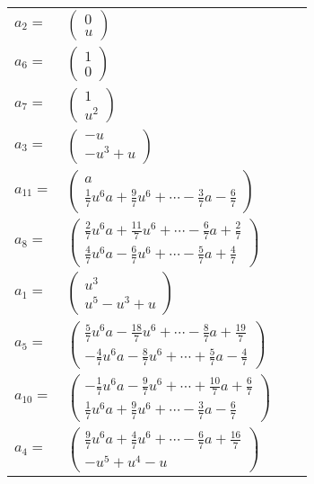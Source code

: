 \documentclass[1p]{elsarticle_modified}
\theoremstyle{definition}
\begin{document}
\begin{tabular}{m{7pt} m{180pt} m{7pt} m{180pt} }
\flushright $a_{2}=$&$\begin{pmatrix}0\\u\end{pmatrix}$ \\
\flushright $a_{6}=$&$\begin{pmatrix}1\\0\end{pmatrix}$ \\
\flushright $a_{7}=$&$\begin{pmatrix}1\\u^2\end{pmatrix}$ \\
\flushright $a_{3}=$&$\begin{pmatrix}- u\\- u^3+u\end{pmatrix}$ \\
\flushright $a_{11}=$&$\begin{pmatrix}a\\\frac{1}{7} u^6 a+\frac{9}{7} u^6+\cdots-\frac{3}{7} a-\frac{6}{7}\end{pmatrix}$ \\
\flushright $a_{8}=$&$\begin{pmatrix}\frac{2}{7} u^6 a+\frac{11}{7} u^6+\cdots-\frac{6}{7} a+\frac{2}{7}\\\frac{4}{7} u^6 a-\frac{6}{7} u^6+\cdots-\frac{5}{7} a+\frac{4}{7}\end{pmatrix}$ \\
\flushright $a_{1}=$&$\begin{pmatrix}u^3\\u^5- u^3+u\end{pmatrix}$ \\
\flushright $a_{5}=$&$\begin{pmatrix}\frac{5}{7} u^6 a-\frac{18}{7} u^6+\cdots-\frac{8}{7} a+\frac{19}{7}\\-\frac{4}{7} u^6 a-\frac{8}{7} u^6+\cdots+\frac{5}{7} a-\frac{4}{7}\end{pmatrix}$ \\
\flushright $a_{10}=$&$\begin{pmatrix}-\frac{1}{7} u^6 a-\frac{9}{7} u^6+\cdots+\frac{10}{7} a+\frac{6}{7}\\\frac{1}{7} u^6 a+\frac{9}{7} u^6+\cdots-\frac{3}{7} a-\frac{6}{7}\end{pmatrix}$ \\
\flushright $a_{4}=$&$\begin{pmatrix}\frac{9}{7} u^6 a+\frac{4}{7} u^6+\cdots-\frac{6}{7} a+\frac{16}{7}\\- u^5+u^4- u\end{pmatrix}$ \\

\end{tabular}
\end{document}
